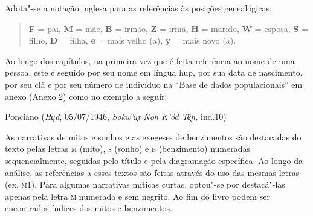 \bigskip

Adota"-se a notação inglesa para as referências às posições genealógicas:

\begin{quote}
\textbf{F} = pai, \textbf{M} = mãe, \textbf{B} = irmão, \textbf{Z} =
irmã, \textbf{H} = marido, \textbf{W} = esposa, \textbf{S} = filho,
\textbf{D} = filha, \textbf{e} = mais velho (a), \textbf{y} = mais novo
(a).
\end{quote}

\medskip

Ao longo dos capítulos, na primeira vez que é feita referência ao nome de
uma pessoa, este é seguido por seu nome em língua hup, por sua data de
nascimento, por seu clã e por seu número de indivíduo na ``Base de dados
populacionais'' em anexo (Anexo 2) como no exemplo a seguir:

Ponciano (\textit{Hu̖d}, 05/07/1946, \textit{Sokw'ä̗t Noh K'öd Tẽ̖h,} ind.10)

As narrativas de mitos e sonhos e as exegeses de benzimentos são
destacadas do texto pelas letras \textsc{m} (mito), \textsc{s} (sonho) e
\textsc{b} (benzimento) numeradas sequencialmente, seguidas
pelo título e pela diagramação específica. Ao longo da análise, as
referências a esses textos são feitas através do uso das mesmas letras
(ex. \textsc{m1}). Para algumas narrativas míticas curtas, optou"-se
por destacá"-las apenas pela letra \textsc{m} numerada e sem negrito. Ao fim do
livro podem ser encontrados índices dos mitos e benzimentos.